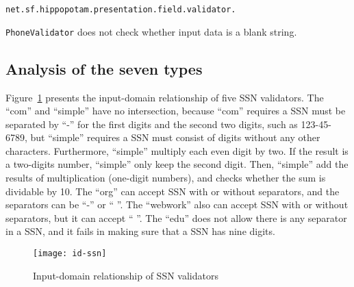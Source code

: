 \verb|net.sf.hippopotam.presentation.field.validator.|

\verb|PhoneValidator| 
does not check whether input data is a blank string. 







\subsection{Analysis of the seven types}

Figure~\ref{fig:id-ssn} presents the input-domain relationship of five SSN validators.
The ``com'' and ``simple'' have no intersection, because ``com'' requires a SSN must be separated by ``-'' for the first digits and the second two digits, such as 123-45-6789, but ``simple'' requires a SSN must consist of digits without any other characters. Furthermore, ``simple'' multiply each even digit by two. If the result is a two-digits number, ``simple'' only keep the second digit. Then, ``simple'' add the results of multiplication (one-digit numbers), and checks whether the sum is dividable by 10. The ``org'' can accept SSN with or without separators, and the separators can be ``-'' or `` ''. The ``webwork'' also can accept SSN with or without separators, but it can accept `` ''. The ``edu'' does not allow there is any separator in a SSN, and it fails in making sure that a SSN has nine digits.

\begin{figure}
\centering
\texttt{[image: id-ssn]}
\caption{Input-domain relationship of SSN validators}  
\label{fig:id-ssn}
\end{figure}

